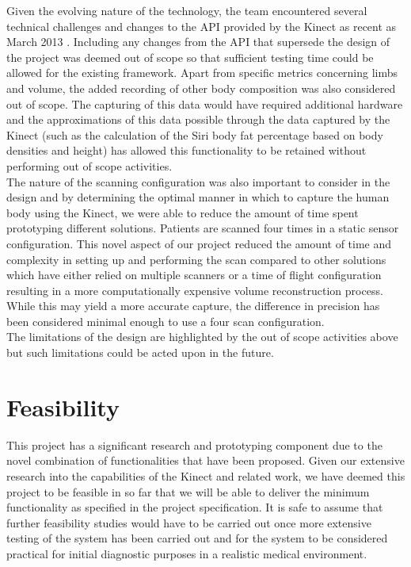 Given the evolving nature of the technology, the team encountered several technical challenges and changes to the API provided by the Kinect as recent as March 2013 \cite{SDK13}. Including any changes from the API that supersede the design of the project was deemed out of scope so that sufficient testing time could be allowed for the existing framework. Apart from specific metrics concerning limbs and volume, the added recording of other body composition was also considered out of scope. The capturing of this data would have required additional hardware and the approximations of this data possible through the data captured by the Kinect (such as the calculation of the Siri body fat percentage based on body densities and height) has allowed this functionality to be retained without performing out of scope activities. \\

The nature of the scanning configuration was also important to consider in the design and by determining the optimal manner in which to capture the human body using the Kinect, we were able to reduce the amount of time spent prototyping different solutions. Patients are scanned four times in a static sensor configuration. This novel aspect of our project reduced the amount of time and complexity in setting up and performing the scan compared to other solutions which have either relied on multiple scanners \cite{Zhou2012} or a time of flight configuration resulting in a more computationally expensive volume reconstruction process. While this may yield a more accurate capture, the difference in precision has been considered minimal enough to use a four scan configuration. \\

The limitations of the design are highlighted by the out of scope activities above but such limitations could be acted upon in the future. \\

\section{Feasibility}

This project has a significant research and prototyping component due to the novel combination of functionalities that have been proposed. Given our extensive research into the capabilities of the Kinect and related work, we have deemed this project to be feasible in so far that we will be able to deliver the minimum functionality as specified in the project specification. It is safe to assume that further feasibility studies would have to be carried out once more extensive testing of the system has been carried out and for the system to be considered practical for initial diagnostic purposes in a realistic medical environment.

